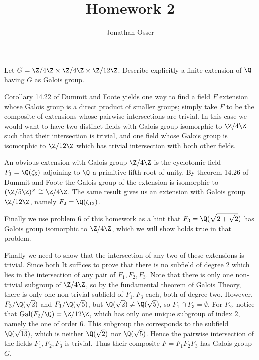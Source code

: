 \documentclass[a4paper, 11pt]{homework}
\author{Jonathan Osser}
\title{Homework 2}
\newcommand{\Gal}{\mathrm{Gal}}
\begin{document}
\maketitle

\begin{questions}
	\question{} Let \(G = \Z/4\Z \times \Z/4\Z \times \Z/12\Z\). Describe explicitly a finite extension of \(\Q\)
	having \(G\) as Galois group.

	\begin{solution}
		Corollary 14.22 of Dummit and Foote yields one way to find a field \(F\) extension whose Galois group is a
		direct product of smaller groups; simply take \(F\) to be the composite of extensions whose pairwise
		intersections are trivial. In this case we would want to have two	distinct fields with Galois group isomorphic
		to \(\Z/4\Z\) such that their intersection is trivial, and one field whose Galois group is isomorphic to
		\(\Z/12\Z\) which has trivial intersection with both other fields.

		An obvious extension with Galois group \(\Z/4\Z\) is the cyclotomic field \(F_1 = \Q(\zeta_5)\) adjoining to
		\(\Q\) a primitive fifth root of unity. By theorem 14.26 of Dummit and Foote the Galois group of the extension
		is isomorphic to \((\Z/5\Z)^\times \cong \Z/4\Z\). The same result gives us an extension with Galois group
		\(\Z/12\Z\), namely \(F_2 = \Q(\zeta_{13})\).

		Finally we use problem 6 of this homework as a hint that \(F_3 = \Q(\sqrt{2+\sqrt{2}})\) has Galois group
		isomorphic to \(\Z/4\Z\), which we will show holds true in that problem.

		Finally we need to show that the intersection of any two of these extensions is trivial. Since both It suffices
		to prove that there is no subfield of degree \(2\) which lies in the intersection of any pair of \(F_1,F_2,F_3
		\). Note that there is only one non-trivial subgroup of \(\Z/4\Z\), so by the fundamental theorem of Galois
		Theory, there is only one non-trivial subfield of \(F_1,F_3\) each, both of degree two. However, \(F_3/\Q(
		\sqrt2)\) and \(F_1/\Q(\sqrt5)\), but \(\Q(\sqrt2) \ne \Q(\sqrt5)\), so \(F_1 \cap F_3 = \emptyset\). For
		\(F_2\), notice that \(\Gal(F_2/\Q) = \Z/12\Z\), which has only one unique subgroup of index \(2\), namely
		the one of order \(6\). This subgroup the corresponds to the subfield \(\Q(\sqrt{13})\), which is neither
		\(\Q(\sqrt2)\) nor \(\Q(\sqrt5)\). Hence the pairwise intersection of the fields \(F_1,F_2,F_3\) is trivial.
		Thus their composite \(F = F_1F_2F_3\) has Galois group \(G\).
	\end{solution}


\end{questions}
\end{document}

